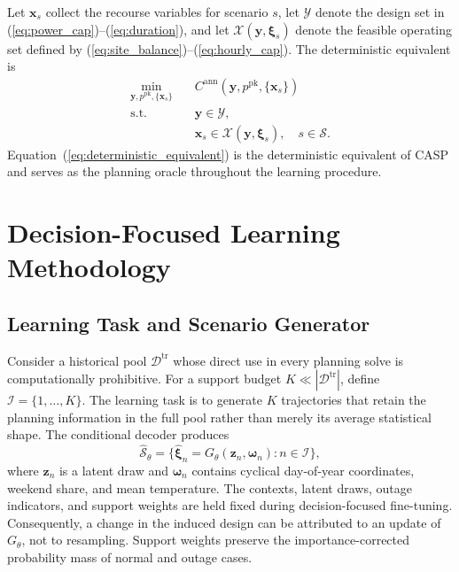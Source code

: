 \documentclass[times]{elsarticle}
\begin{document}
Let $\bm x_s$ collect the recourse variables for scenario $s$, let
$\mathcal Y$ denote the design set in
(\ref{eq:power_cap})--(\ref{eq:duration}), and let
$\mathcal X(\bm y,\bm\xi_s)$ denote the feasible operating set defined by
(\ref{eq:site_balance})--(\ref{eq:hourly_cap}). The deterministic equivalent is
\begin{equation}
\begin{aligned}
\min_{\bm y,p^{\mathrm{pk}},\{\bm x_s\}}\quad
&C^{\mathrm{ann}}(\bm y,p^{\mathrm{pk}},\{\bm x_s\})\\
\mathrm{s.t.}\quad
&\bm y\in\mathcal Y,\\
&\bm x_s\in\mathcal X(\bm y,\bm\xi_s),\quad s\in\mathcal S.
\end{aligned}
\label{eq:deterministic_equivalent}
\end{equation}
Equation~(\ref{eq:deterministic_equivalent}) is the deterministic equivalent of
CASP and serves as the planning oracle throughout the learning procedure.

\section{Decision-Focused Learning Methodology}
\label{sec:methodology}

\subsection{Learning Task and Scenario Generator}

Consider a historical pool $\mathcal D^{\mathrm{tr}}$ whose direct use in every
planning solve is computationally prohibitive. For a support budget
$K\ll|\mathcal D^{\mathrm{tr}}|$, define
$\mathcal I=\{1,\ldots,K\}$. The learning task is to generate $K$ trajectories
that retain the planning information in the full pool rather than merely its
average statistical shape. The conditional decoder produces
\begin{equation}
\widehat{\mathcal S}_\theta=
\{\widehat{\bm\xi}_n=G_\theta(\bm z_n,\bm\omega_n):n\in\mathcal I\},
\label{eq:generated_support}
\end{equation}
where $\bm z_n$ is a latent draw and $\bm\omega_n$ contains cyclical
day-of-year coordinates, weekend share, and mean temperature. The contexts,
latent draws, outage indicators, and support weights are held fixed during
decision-focused fine-tuning. Consequently, a change in the induced design can
be attributed to an update of $G_\theta$, not to resampling. Support weights
preserve the importance-corrected probability mass of normal and outage cases.
\end{document}
